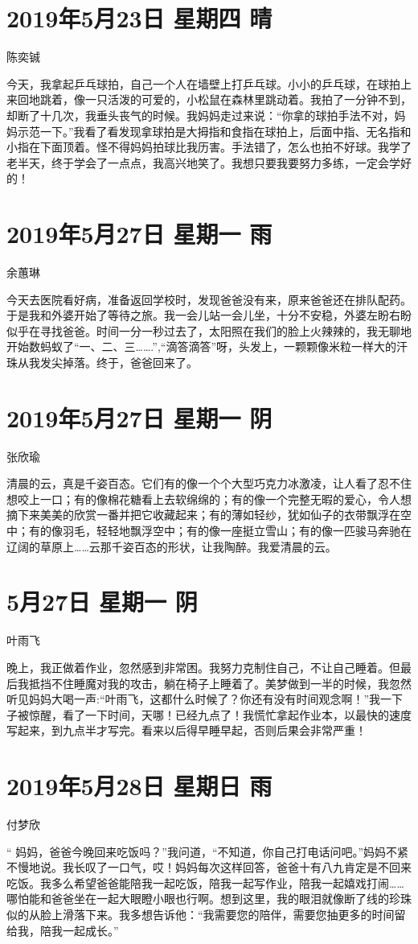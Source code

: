\section{2019年5月23日 星期四 晴}

陈奕铖

今天，我拿起乒乓球拍，自己一个人在墙壁上打乒乓球。小小的乒乓球，在球拍上来回地跳着，像一只活泼的可爱的，小松鼠在森林里跳动着。我拍了一分钟不到，却断了十几次，我垂头丧气的时候。我妈妈走过来说：``你拿的球拍手法不对，妈妈示范一下。''我看了看发现拿球拍是大拇指和食指在球拍上，后面中指、无名指和小指在下面顶着。怪不得妈妈拍球比我历害。手法错了，怎么也拍不好球。我学了老半天，终于学会了一点点，我高兴地笑了。我想只要我要努力多练，一定会学好的！

\section{2019年5月27日 星期一 雨}

余蕙琳

今天去医院看好病，准备返回学校时，发现爸爸没有来，原来爸爸还在排队配药。于是我和外婆开始了等待之旅。我一会儿站一会儿坐，十分不安稳，外婆左盼右盼似乎在寻找爸爸。时间一分一秒过去了，太阳照在我们的脸上火辣辣的，我无聊地开始数蚂蚁了``一、二、三\ldots\ldots.'',``滴答滴答''呀，头发上，一颗颗像米粒一样大的汗珠从我发尖掉落。终于，爸爸回来了。

\section{2019年5月27日 星期一 阴}

张欣瑜

清晨的云，真是千姿百态。它们有的像一个个大型巧克力冰激凌，让人看了忍不住想咬上一口；有的像棉花糖看上去软绵绵的；有的像一个完整无暇的爱心，令人想摘下来美美的欣赏一番并把它收藏起来；有的薄如轻纱，犹如仙子的衣带飘浮在空中；有的像羽毛，轻轻地飘浮空中；有的像一座挺立雪山；有的像一匹骏马奔驰在辽阔的草原上\ldots\ldots 云那千姿百态的形状，让我陶醉。我爱清晨的云。

\section{5月27日 星期一 阴}

叶雨飞

晚上，我正做着作业，忽然感到非常困。我努力克制住自己，不让自己睡着。但最后我抵挡不住睡魔对我的攻击，躺在椅子上睡着了。美梦做到一半的时候，我忽然听见妈妈大喝一声:``叶雨飞，这都什么时候了？你还有没有时间观念啊！''我一下子被惊醒，看了一下时间，天哪！已经九点了！我慌忙拿起作业本，以最快的速度写起来，到九点半才写完。看来以后得早睡早起，否则后果会非常严重！

\section{2019年5月28日 星期日 雨}

付梦欣

``
妈妈，爸爸今晚回来吃饭吗？''我问道，``不知道，你自己打电话问吧。''妈妈不紧不慢地说。我长叹了一口气，哎！妈妈每次这样回答，爸爸十有八九肯定是不回来吃饭。我多么希望爸爸能陪我一起吃饭，陪我一起写作业，陪我一起嬉戏打闹\ldots\ldots 哪怕能和爸爸坐在一起大眼瞪小眼也行啊。想到这里，我的眼泪就像断了线的珍珠似的从脸上滑落下来。我多想告诉他：``我需要您的陪伴，需要您抽更多的时间留给我，陪我一起成长。''
